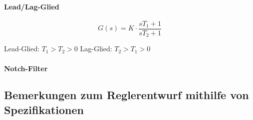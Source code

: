 \paragraph{Lead/Lag-Glied }

    \begin{minipage}{6cm}
        \[ G(s) = K \cdot \dfrac{sT_1+1}{sT_2+1} \]
    \end{minipage}
    \begin{minipage}{8cm}
        Lead-Glied: $T_1 > T_2 > 0$ \newline
        Lag-Glied: $T_2 > T_1 > 0$ 
    \end{minipage}

\paragraph{Notch-Filter }



\subsection{Bemerkungen zum Reglerentwurf mithilfe von Spezifikationen }

